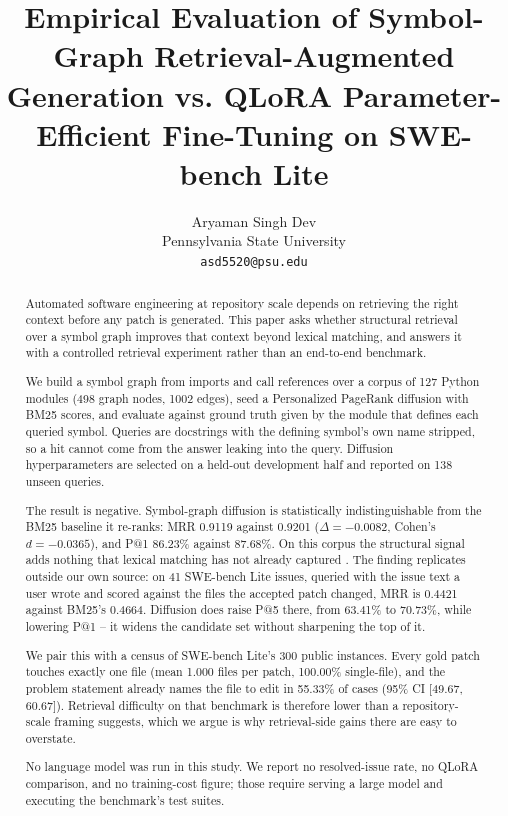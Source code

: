 \documentclass[10pt,journal,compsoc,twocolumn]{IEEEtran}
\begin{document}
\title{Empirical Evaluation of Symbol-Graph Retrieval-Augmented Generation vs. QLoRA Parameter-Efficient Fine-Tuning on SWE-bench Lite}

\author{
Aryaman Singh Dev\\
Pennsylvania State University \\
\texttt{asd5520@psu.edu}
}

\maketitle

\begin{abstract}
Automated software engineering at repository scale depends on retrieving the right context before any patch is generated. This paper asks whether structural retrieval over a symbol graph improves that context beyond lexical matching, and answers it with a controlled retrieval experiment rather than an end-to-end benchmark.

We build a symbol graph from imports and call references over a corpus of 127 Python modules (498 graph nodes, 1002 edges), seed a Personalized PageRank diffusion with BM25 scores, and evaluate against ground truth given by the module that defines each queried symbol. Queries are docstrings with the defining symbol's own name stripped, so a hit cannot come from the answer leaking into the query. Diffusion hyperparameters are selected on a held-out development half and reported on 138 unseen queries.

The result is negative. Symbol-graph diffusion is statistically indistinguishable from the BM25 baseline it re-ranks: MRR 0.9119 against 0.9201 ($\Delta = -0.0082$, Cohen's $d = -0.0365$), and P@1 86.23\% against 87.68\%. On this corpus the structural signal adds nothing that lexical matching has not already captured \cite{arxiv_2501_02497}. The finding replicates outside our own source: on 41 SWE-bench Lite issues, queried with the issue text a user wrote and scored against the files the accepted patch changed, MRR is 0.4421 against BM25's 0.4664. Diffusion does raise P@5 there, from 63.41\% to 70.73\%, while lowering P@1 -- it widens the candidate set without sharpening the top of it.

We pair this with a census of SWE-bench Lite's 300 public instances. Every gold patch touches exactly one file (mean 1.000 files per patch, 100.00\% single-file), and the problem statement already names the file to edit in 55.33\% of cases (95\% CI [49.67, 60.67]). Retrieval difficulty on that benchmark is therefore lower than a repository-scale framing suggests, which we argue is why retrieval-side gains there are easy to overstate.

No language model was run in this study. We report no resolved-issue rate, no QLoRA comparison, and no training-cost figure; those require serving a large model and executing the benchmark's test suites.
\end{abstract}
\end{document}
